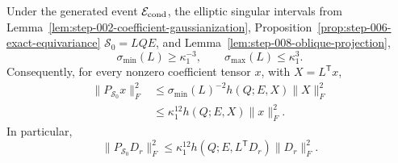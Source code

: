 \begin{proposition}
\label{prop:step-008-elliptic-transfer}
Under the generated event \(\mathcal E_{\rm cond}\), the elliptic
singular intervals from
Lemma~\ref{lem:step-002-coefficient-gaussianization},
Proposition~\ref{prop:step-006-exact-equivariance} \(\mathscr S_0=LQE\), and
Lemma~\ref{lem:step-008-oblique-projection},
\begin{equation}
  \sigma_{\min}(L)\ge\kappa_1^{-3},
  \qquad
  \sigma_{\max}(L)\le\kappa_1^3.                          \label{eq:step-008-7}
\end{equation}
Consequently, for every nonzero coefficient tensor \(x\), with
\(X=L^{\mathsf T}x\),
\begin{equation}
\begin{aligned}
  \|P_{\mathscr S_0}x\|_F^2
  &\le \sigma_{\min}(L)^{-2}
      h(Q;E,X)\|X\|_F^2\\
  &\le \kappa_1^{12}h(Q;E,X)\|x\|_F^2.
\end{aligned}\label{eq:step-008-8}
\end{equation}
In particular,
\begin{equation}
  \|P_{\mathscr S_0}D_r\|_F^2
  \le\kappa_1^{12}h(Q;E,L^{\mathsf T}D_r)\|D_r\|_F^2.
                                                               \label{eq:step-008-9}
\end{equation}

\end{proposition}

